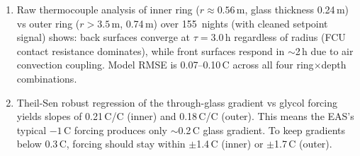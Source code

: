 \documentclass[11pt]{article}
\begin{document}
\begin{enumerate}
  \item Raw thermocouple analysis of inner ring ($r \approx 0.56$\,m,
    glass thickness 0.24\,m) vs outer ring ($r > 3.5$\,m, 0.74\,m)
    over 155~nights (with cleaned setpoint signal) shows: back
    surfaces converge at $\tau = 3.0$\,h regardless of radius (FCU
    contact resistance dominates), while front surfaces respond in
    $\sim$2\,h due to air convection coupling.  Model RMSE is
    0.07--0.10\,\textdegree C across all four ring$\times$depth
    combinations.

  \item Theil-Sen robust regression of the through-glass gradient
    vs glycol forcing yields slopes of 0.21\,\textdegree C/\textdegree C
    (inner) and 0.18\,\textdegree C/\textdegree C (outer).  This
    means the EAS's typical $-1$\,\textdegree C forcing produces
    only $\sim$0.2\,\textdegree C glass gradient.  To keep gradients
    below 0.3\,\textdegree C, forcing should stay within
    $\pm$1.4\,\textdegree C (inner) or $\pm$1.7\,\textdegree C (outer).
\end{enumerate}
\end{document}
